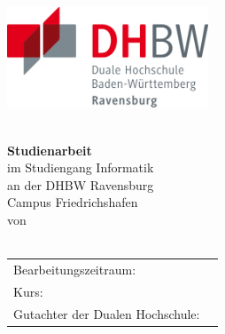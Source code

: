 \begin{titlepage}
	\vspace*{-2cm}
	\includegraphics[height=3cm]{images/DHBW_logo.png}
	\hfill
	\rm
	\begin{center}
		\vspace*{2cm}
		\LARGE\textbf{\myTopic}\\
		\vspace*{2cm}
		\textbf{Studienarbeit}\\
		\normalsize
		\vspace*{1.3cm}
		im Studiengang Informatik\\
		\vspace*{0.3cm}
		an der DHBW Ravensburg\\
		Campus Friedrichshafen\\
		\vspace*{1cm}
		von\\
		\myAutor\\
		\vspace*{2cm}
		\myEndDate
		\vfill
	\end{center}
	\begin{tabular}{ll}
		Bearbeitungszeitraum:&\myProcessingTime\\
		Kurs:&\myCourseOfStudies\\
		Gutachter der Dualen Hochschule:&\myProf\\
	\end{tabular}
\end{titlepage}
\newpage
\setcounter{page}{2}
